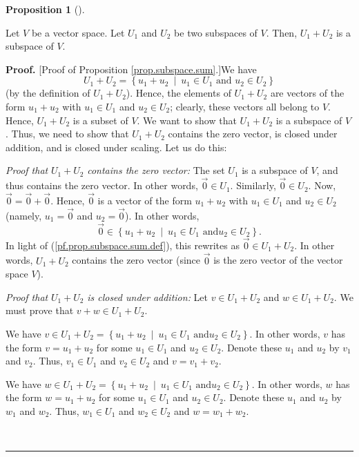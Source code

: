\documentclass[numbers=enddot,12pt,final,onecolumn,notitlepage]{scrartcl}%
\theoremstyle{definition}
\newtheorem{prop}[theo]{Proposition}
\newenvironment{proposition}[1][]
{\begin{prop}[#1]\begin{leftbar}}
{\end{leftbar}\end{prop}}
\newenvironment{proof}[1][Proof]{\noindent\textbf{#1.} }{\ \rule{0.5em}{0.5em}}
\begin{document}
\begin{proposition}
\label{prop.subspace.sum}Let $V$ be a vector space. Let $U_{1}$ and $U_{2}$ be
two subspaces of $V$. Then, $U_{1}+U_{2}$ is a subspace of $V$.
\end{proposition}

\begin{proof}
[Proof of Proposition \ref{prop.subspace.sum}.]We have%
\begin{equation}
U_{1}+U_{2}=\left\{  u_{1}+u_{2}\ \mid\ u_{1}\in U_{1}\text{ and }u_{2}\in
U_{2}\right\}  \label{pf.prop.subspace.sum.def}%
\end{equation}
(by the definition of $U_{1}+U_{2}$). Hence, the elements of $U_{1}+U_{2}$ are
vectors of the form $u_{1}+u_{2}$ with $u_{1}\in U_{1}$ and $u_{2}\in U_{2}$;
clearly, these vectors all belong to $V$. Hence, $U_{1}+U_{2}$ is a subset of
$V$. We want to show that $U_{1}+U_{2}$ is a subspace of $V$. Thus, we need to
show that $U_{1}+U_{2}$ contains the zero vector, is closed under addition,
and is closed under scaling. Let us do this:

\textit{Proof that }$U_{1}+U_{2}$\textit{ contains the zero vector:} The set
$U_{1}$ is a subspace of $V$, and thus contains the zero vector. In other
words, $\overrightarrow{0}\in U_{1}$. Similarly, $\overrightarrow{0}\in U_{2}%
$. Now, $\overrightarrow{0}=\overrightarrow{0}+\overrightarrow{0}$. Hence,
$\overrightarrow{0}$ is a vector of the form $u_{1}+u_{2}$ with $u_{1}\in
U_{1}$ and $u_{2}\in U_{2}$ (namely, $u_{1}=\overrightarrow{0}$ and
$u_{2}=\overrightarrow{0}$). In other words,%
\[
\overrightarrow{0}\in\left\{  u_{1}+u_{2}\ \mid\ u_{1}\in U_{1}\text{ and
}u_{2}\in U_{2}\right\}  .
\]
In light of (\ref{pf.prop.subspace.sum.def}), this rewrites as
$\overrightarrow{0}\in U_{1}+U_{2}$. In other words, $U_{1}+U_{2}$ contains
the zero vector (since $\overrightarrow{0}$ is the zero vector of the vector
space $V$).

\textit{Proof that }$U_{1}+U_{2}$ \textit{is closed under addition:} Let $v\in
U_{1}+U_{2}$ and $w\in U_{1}+U_{2}$. We must prove that $v+w\in U_{1}+U_{2}$.

We have $v\in U_{1}+U_{2}=\left\{  u_{1}+u_{2}\ \mid\ u_{1}\in U_{1}\text{ and
}u_{2}\in U_{2}\right\}  $. In other words, $v$ has the form $v=u_{1}+u_{2}$
for some $u_{1}\in U_{1}$ and $u_{2}\in U_{2}$. Denote these $u_{1}$ and
$u_{2}$ by $v_{1}$ and $v_{2}$. Thus, $v_{1}\in U_{1}$ and $v_{2}\in U_{2}$
and $v=v_{1}+v_{2}$.

We have $w\in U_{1}+U_{2}=\left\{  u_{1}+u_{2}\ \mid\ u_{1}\in U_{1}\text{ and
}u_{2}\in U_{2}\right\}  $. In other words, $w$ has the form $w=u_{1}+u_{2}$
for some $u_{1}\in U_{1}$ and $u_{2}\in U_{2}$. Denote these $u_{1}$ and
$u_{2}$ by $w_{1}$ and $w_{2}$. Thus, $w_{1}\in U_{1}$ and $w_{2}\in U_{2}$
and $w=w_{1}+w_{2}$.


\end{proof}
\end{document}
